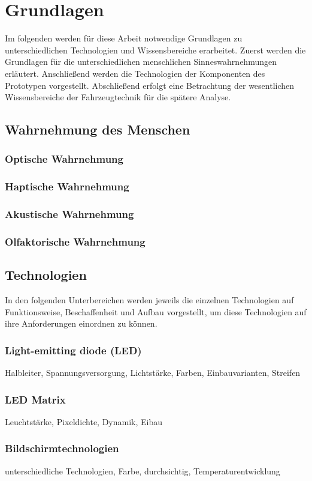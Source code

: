 \chapter{Grundlagen}
\label{cha:Grundlagen}
Im folgenden werden für diese Arbeit notwendige Grundlagen zu unterschiedlichen Technologien und Wissensbereiche erarbeitet. Zuerst werden die Grundlagen für die unterschiedlichen menschlichen Sinneswahrnehmungen erläutert. Anschließend werden die Technologien der Komponenten des Prototypen vorgestellt. Abschließend erfolgt eine Betrachtung der wesentlichen Wissensbereiche der Fahrzeugtechnik für die spätere Analyse.
\section{Wahrnehmung des Menschen}
\subsection{Optische Wahrnehmung}
\subsection{Haptische Wahrnehmung}
\subsection{Akustische Wahrnehmung}
\subsection{Olfaktorische Wahrnehmung}

\section{Technologien}
In den folgenden Unterbereichen werden jeweils die einzelnen Technologien auf Funktionsweise, Beschaffenheit und Aufbau vorgestellt, um diese Technologien auf ihre Anforderungen einordnen zu können.
\subsection{Light-emitting diode (LED)}
Halbleiter, Spannungsversorgung, Lichtstärke, Farben, Einbauvarianten, Streifen
\subsection{LED Matrix}
Leuchtstärke, Pixeldichte, Dynamik, Eibau
\subsection{Bildschirmtechnologien}
unterschiedliche Technologien, Farbe, durchsichtig, Temperaturentwicklung

